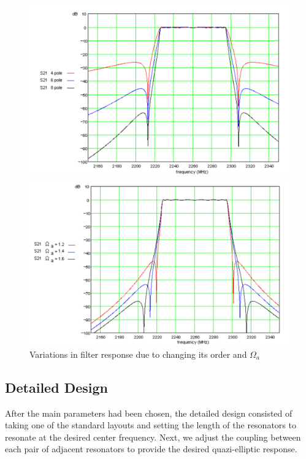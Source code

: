 \begin{figure}[ht]
\begin{center}
\hspace{-8em}
\includegraphics[scale=0.6]{fig/design-vary-order.pdf}

\hspace{-8em}
\includegraphics[scale=0.6]{fig/design-vary-omega.pdf}
\end{center}

\caption{Variations in filter response due to changing its order and $\Omega_a$}
\label{figure:filter-variation}
\end{figure}


\subsection{Detailed Design}
After the main parameters had been chosen, the detailed design consisted of taking one of the standard layouts and setting the length of the resonators to resonate at the desired center frequency. Next, we adjust the coupling between each pair of adjacent resonators to provide the desired quazi-elliptic response. 

